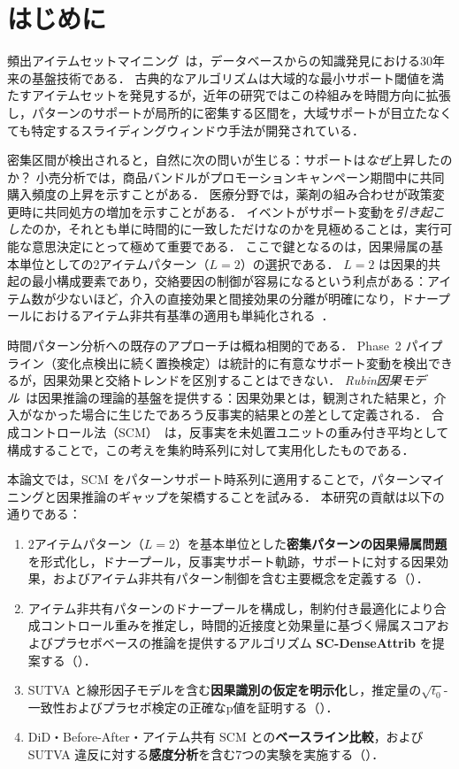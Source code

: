 \section{はじめに}
\label{sec:introduction}

頻出アイテムセットマイニング~\cite{agrawal1994fast}は，データベースからの知識発見における30年来の基盤技術である．
古典的なアルゴリズムは大域的な最小サポート閾値を満たすアイテムセットを発見するが，近年の研究ではこの枠組みを時間方向に拡張し，パターンのサポートが局所的に密集する区間を，大域サポートが目立たなくても特定するスライディングウィンドウ手法が開発されている．

密集区間が検出されると，自然に次の問いが生じる：サポートは\emph{なぜ}上昇したのか？
小売分析では，商品バンドルがプロモーションキャンペーン期間中に共同購入頻度の上昇を示すことがある．
医療分野では，薬剤の組み合わせが政策変更時に共同処方の増加を示すことがある．
イベントがサポート変動を\emph{引き起こした}のか，それとも単に時間的に一致しただけなのかを見極めることは，実行可能な意思決定にとって極めて重要である．
ここで鍵となるのは，因果帰属の基本単位としての2アイテムパターン（$L=2$）の選択である．
$L=2$ は因果的共起の最小構成要素であり，交絡要因の制御が容易になるという利点がある：アイテム数が少ないほど，介入の直接効果と間接効果の分離が明確になり，ドナープールにおけるアイテム非共有基準の適用も単純化される~\cite{lancaster2018surges}．

時間パターン分析への既存のアプローチは概ね相関的である．
Phase~2 パイプライン（変化点検出に続く置換検定）は統計的に有意なサポート変動を検出できるが，因果効果と交絡トレンドを区別することはできない．
\emph{Rubin因果モデル}~\cite{rubin1974estimating}は因果推論の理論的基盤を提供する：因果効果とは，観測された結果と，介入がなかった場合に生じたであろう反事実的結果との差として定義される．
合成コントロール法（SCM）~\cite{abadie2010synthetic}は，反事実を未処置ユニットの重み付き平均として構成することで，この考えを集約時系列に対して実用化したものである．

本論文では，SCM をパターンサポート時系列に適用することで，パターンマイニングと因果推論のギャップを架橋することを試みる．
本研究の貢献は以下の通りである：

\begin{enumerate}
    \item 2アイテムパターン（$L=2$）を基本単位とした\textbf{密集パターンの因果帰属問題}を形式化し，ドナープール，反事実サポート軌跡，サポートに対する因果効果，およびアイテム非共有パターン制御を含む主要概念を定義する（）．
    \item アイテム非共有パターンのドナープールを構成し，制約付き最適化により合成コントロール重みを推定し，時間的近接度と効果量に基づく帰属スコアおよびプラセボベースの推論を提供するアルゴリズム \textbf{SC-DenseAttrib} を提案する（）．
    \item SUTVA と線形因子モデルを含む\textbf{因果識別の仮定を明示化}し，推定量の$\sqrt{t_0}$-一致性およびプラセボ検定の正確なp値を証明する（）．
    \item DiD・Before-After・アイテム共有 SCM との\textbf{ベースライン比較}，および SUTVA 違反に対する\textbf{感度分析}を含む7つの実験を実施する（）．
\end{enumerate}
